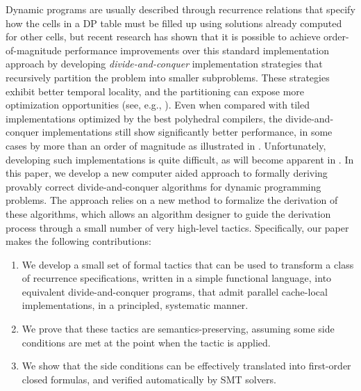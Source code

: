 Dynamic programs are usually described through recurrence relations
that specify how the cells in a DP table must be filled up
using solutions already computed for other cells, but recent research has shown that it is possible
to achieve order-of-magnitude performance improvements over this
standard implementation approach by developing \emph{divide-and-conquer}
 implementation strategies that recursively
partition the problem into smaller subproblems.  These strategies
exhibit better temporal locality, and the partitioning can expose more
optimization opportunities (see, e.g., \cite{IPDPS15/Tithi}). 
Even when compared with tiled implementations optimized by the best polyhedral compilers, 
the divide-and-conquer implementations still show significantly better performance, in some cases
by more than an order of magnitude as illustrated in . 
Unfortunately, developing such implementations is quite difficult, as will become apparent in . 
In this paper, we develop a new computer aided approach to formally deriving provably correct divide-and-conquer algorithms
for dynamic programming problems. The approach relies on a new method to formalize the derivation of these algorithms, which
allows an algorithm designer to guide the derivation process through a small number of very high-level tactics. 
Specifically, our paper makes the following contributions:
\begin{enumerate}
  \item We develop a small set of formal tactics that can be used to transform a class of recurrence
  specifications, written in a simple functional language, 
  into equivalent divide-and-conquer programs, that admit parallel cache-local
  implementations, in a principled, systematic manner.
  \item We prove that these tactics are semantics-preserving, assuming some side conditions are met
  at the point when the tactic is applied.
  \item We show that the side conditions can be effectively translated into first-order closed
  formulas, and verified automatically by SMT solvers.
\end{enumerate}



